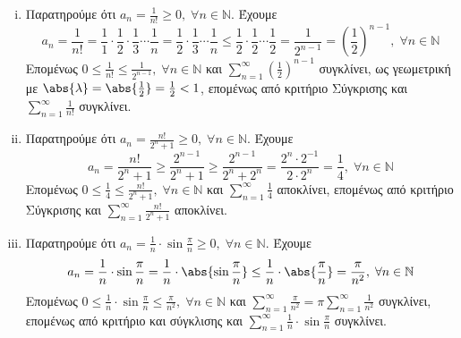 \begin{enumerate}
\begin{enumerate}[i)]
        \item Παρατηρούμε ότι $ a_{n} = \frac{1}{n!} \geq 0, \; \forall n \in 
            \mathbb{N} $. Έχουμε 
            \[
                a_{n}= \frac{1}{n!} = \frac{1}{1} \cdot \frac{1}{2} \cdot 
                \frac{1}{3} \cdots
                \frac{1}{n} = \frac{1}{2} \cdot \frac{1}{3} \cdots \frac{1}{n} \leq 
                \frac{1}{2} \cdot \frac{1}{2} \cdots \frac{1}{2} = \frac{1}{2^{n-1}} = 
                \left(\frac{1}{2} \right)^{n-1}, 
                \; \forall n \in \mathbb{N} 
            \] 
            Επομένως $ 0 \leq \frac{1}{n!} \leq \frac{1}{2^{n-1}}, \; \forall n \in 
            \mathbb{N} $ και $ \sum_{n=1}^{\infty} \left(\frac{1}{2} \right)^{n-1}  $ 
            συγκλίνει, ως γεωμετρική με $ \abs{\lambda} = \abs{\frac{1}{2}} = 
            \frac{1}{2} < 1 $, επομένως από κριτήριο Σύγκρισης και 
            $ \sum_{n=1}^{\infty} \frac{1}{n!} $ συγκλίνει.

        \item Παρατηρούμε ότι $ a_{n}= \frac{n!}{2^{n}+1} \geq 0, \; 
            \forall n \in \mathbb{N} $.  Έχουμε 
            \[
                a_{n} = \frac{n!}{2^{n}+1} \geq \frac{2^{n-1}}{2^{n}+1} \geq 
                \frac{2^{n-1}}{2^{n}+2^{n}} = 
                \frac{2^{n}\cdot 2^{-1}}{2\cdot 2^{n}} = \frac{1}{4}, 
                \; \forall n \in \mathbb{N}
            \] 
            Επομένως $ 0 \leq \frac{1}{4} \leq \frac{n!}{2^{n}+1}, \; 
            \forall n \in \mathbb{N}
            $ και $ \sum_{n=1}^{\infty} \frac{1}{4} $ αποκλίνει, επομένως από 
            κριτήριο Σύγκρισης και $ \sum_{n=1}^{\infty} \frac{n!}{2^{n}+1} $ 
            αποκλίνει.

        \item Παρατηρούμε ότι $ a_{n}= \frac{1}{n} \cdot \sin{\frac{\pi}{n}} \geq 0, 
            \; \forall n \in \mathbb{N}$. Έχουμε 
            \[
                a_{n} = \frac{1}{n} \cdot \sin{\frac{\pi}{n}} = \frac{1}{n} 
                \cdot \abs{\sin{\frac{\pi}{n}}} \leq \frac{1}{n} \cdot 
                \abs{\frac{\pi}{n}} = \frac{\pi}{n^{2}}, \; \forall n \in \mathbb{N} 
            \] 
            Επομένως $ 0 \leq \frac{1}{n} \cdot \sin{\frac{\pi}{n}} \leq 
            \frac{\pi}{n^{2}}, \; \forall n \in \mathbb{N}$ και $ \sum_{n=1}^{\infty} 
            \frac{\pi}{n^{2}} = \pi \sum_{n=1}^{\infty} \frac{1}{n^{2}}$ συγκλίνει, 
            επομένως από κριτήριο και σύγκλισης και $ \sum_{n=1}^{\infty} 
            \frac{1}{n} \cdot \sin{\frac{\pi}{n}}$ συγκλίνει.
    \end{enumerate} 


\end{enumerate}
